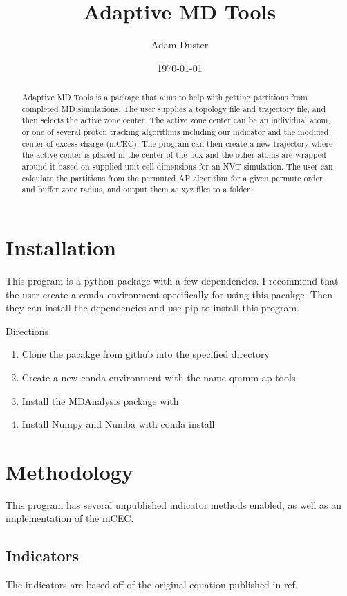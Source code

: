 \documentclass{article}
\title{Adaptive MD Tools}
\author{Adam Duster}
\date{\today}
\begin{document}
\maketitle
\begin{abstract}
Adaptive MD Tools is a package that aims to help with getting partitions from completed MD simulations.
The user supplies a topology file and trajectory file, and then selects the active zone center.
The active zone center can be an individual atom, or one of several proton tracking algorithms including our indicator and the modified center of excess charge (mCEC).
The program can then create a new trajectory where the active center is placed in the center of the box and the other atoms are wrapped around it based on supplied unit cell dimensions for an NVT simulation.
The user can calculate the partitions from the permuted AP algorithm for a given permute order and buffer zone radius, and output them as xyz files to a folder.
\end{abstract}
\section{Installation}
This program is a python package with a few dependencies. I recommend that the user create a conda environment specifically for using this pacakge. Then they can install the dependencies and use pip to install this program.

Directions
\begin{enumerate}
\item Clone the pacakge from github into the specified directory
\item Create a new conda environment with the name qmmm ap tools
\item Install the MDAnalysis package with
\item Install Numpy and Numba with conda install 
\end{enumerate}

\section{Methodology}
This program has several unpublished indicator methods enabled, as well as an implementation of the mCEC.

\subsection{Indicators}
The indicators are based off of the original equation published in ref. 
\end{document}
